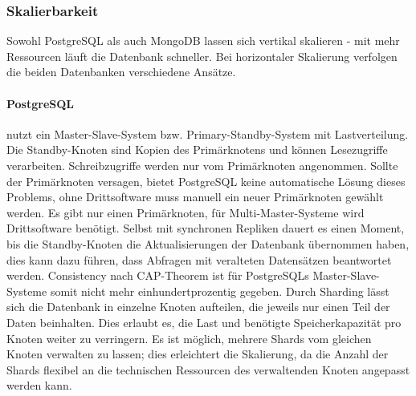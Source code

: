 \subsubsection{Skalierbarkeit}
Sowohl PostgreSQL als auch MongoDB lassen sich vertikal skalieren - mit mehr Ressourcen läuft die Datenbank schneller. Bei horizontaler Skalierung verfolgen die beiden Datenbanken verschiedene Ansätze.
\paragraph{PostgreSQL} nutzt ein Master-Slave-System bzw. Primary-Standby-System mit Lastverteilung.\cite{PG6} Die Standby-Knoten sind Kopien des Primärknotens und können Lesezugriffe verarbeiten. Schreibzugriffe werden nur vom Primärknoten angenommen. Sollte der Primärknoten versagen, bietet PostgreSQL keine automatische Lösung dieses Problems, ohne Drittsoftware muss manuell ein neuer Primärknoten gewählt werden. Es gibt nur einen Primärknoten, für Multi-Master-Systeme wird Drittsoftware benötigt. Selbst mit synchronen Repliken dauert es einen Moment, bis die Standby-Knoten die Aktualisierungen der Datenbank übernommen haben, dies kann dazu führen, dass Abfragen mit veralteten Datensätzen beantwortet werden.\cite{PG8} Consistency nach CAP-Theorem ist für PostgreSQLs Master-Slave-Systeme somit nicht mehr einhundertprozentig gegeben.
Durch Sharding lässt sich die Datenbank in einzelne Knoten aufteilen, die jeweils nur einen Teil der Daten beinhalten. Dies erlaubt es, die Last und benötigte Speicherkapazität pro Knoten weiter zu verringern. Es ist möglich, mehrere Shards vom gleichen Knoten verwalten zu lassen; dies erleichtert die Skalierung, da die Anzahl der Shards flexibel an die technischen Ressourcen des verwaltenden Knoten angepasst werden kann.
